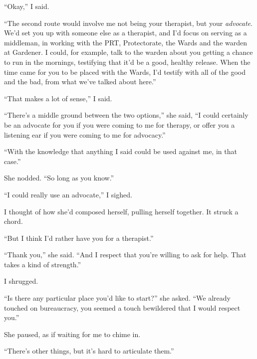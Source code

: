 ``Okay,'' I said.



``The second route would involve me not being your therapist, but your \emph{advocate}.  We'd set you up with someone else as a therapist, and I'd focus on serving as a middleman, in working with the PRT, Protectorate, the Wards and the warden at Gardener.  I could, for example, talk to the warden about you getting a chance to run in the mornings, testifying that it'd be a good, healthy release.  When the time came for you to be placed with the Wards, I'd testify with all of the good and the bad, from what we've talked about here.''



``That makes a lot of sense,'' I said.



``There's a middle ground between the two options,'' she said, ``I could certainly be an advocate for you if you were coming to me for therapy, or offer you a listening ear if you were coming to me for advocacy.''



``With the knowledge that anything I said could be used against me, in that case.''



She nodded.  ``So long as you know.''



``I could really use an advocate,'' I sighed.



I thought of how she'd composed herself, pulling herself together.  It struck a chord.



``But I think I'd rather have you for a therapist.''



``Thank you,'' she said.  ``And I respect that you're willing to ask for help.  That takes a kind of strength.''



I shrugged.



``Is there any particular place you'd like to start?''  she asked.  ``We already touched on bureaucracy, you seemed a touch bewildered that I would respect you.''



She paused, as if waiting for me to chime in.



``There's other things, but it's hard to articulate them.''



